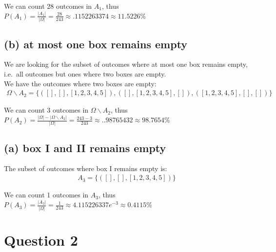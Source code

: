 \documentclass[
]{article}
\begin{document}
We can count 28 outcomes in \(A_1\), thus
\(P(A_1) = \frac{\lvert A_1 \rvert}{\lvert \Omega \rvert} = \frac{28}{243} \approx .1152263374 \approx 11.5226 \%\)

\hypertarget{b-at-most-one-box-remains-empty}{%
\subsection{(b) at most one box remains
empty}\label{b-at-most-one-box-remains-empty}}

We are looking for the subset of outcomes where at most one box remains
empty, i.e.~all outcomes but ones where two boxes are empty.\\
We have the outcomes where two boxes are empty: \begin{equation}
  \begin{aligned}
    \Omega \backslash A_2 = \{{([], [], [1,2,3,4,5]), ([], [1,2,3,4,5], []), ([1,2,3,4,5], [], [])} \}
  \end{aligned}
\end{equation}

We can count 3 outcomes in \(\Omega \backslash A_2\), thus
\(P(A_2) = \frac{\lvert \Omega \rvert - \lvert \Omega \backslash A_2 \rvert}{\lvert \Omega \rvert} = \frac{243-3}{243} \approx ..98765432 \approx 98.7654 \%\)

\hypertarget{a-box-i-and-ii-remains-empty}{%
\subsection{(a) box I and II remains
empty}\label{a-box-i-and-ii-remains-empty}}

The subset of outcomes where box I remains empty is:\\
\begin{equation}
  \begin{aligned}
    A_3 = \{{([], [], [1,2,3,4,5])} \}
  \end{aligned}
\end{equation}

We can count 1 outcomes in \(A_3\), thus
\(P(A_3) = \frac{\lvert A_3 \rvert}{\lvert \Omega \rvert} = \frac{1}{243} \approx 4.115226337e^{-3} \approx 0.4115 \%\)

\hypertarget{question-2}{%
\section{\texorpdfstring{\textbf{Question
2}}{Question 2}}\label{question-2}}
\end{document}
